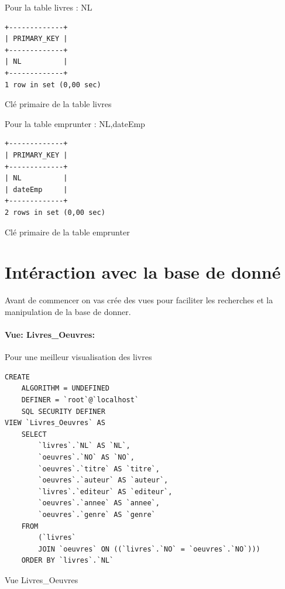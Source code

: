 \documentclass{article}
\begin{document}
\begin{center}
\begin{minipage}{0.5\linewidth}
Pour la table livres : NL
\begin{listing}[H]
\begin{verbatim}
+-------------+
| PRIMARY_KEY |
+-------------+
| NL          |
+-------------+
1 row in set (0,00 sec)
\end{verbatim}
	\caption{Clé primaire de la table livres}
\end{listing}
\end{minipage}

\vspace*{20pt}
\begin{minipage}{0.5\linewidth}
Pour la table emprunter : NL,dateEmp
\begin{listing}[H]
\begin{verbatim}
+-------------+
| PRIMARY_KEY |
+-------------+
| NL          |
| dateEmp     |
+-------------+
2 rows in set (0,00 sec)
\end{verbatim}
	\caption{Clé primaire de la table emprunter}
\end{listing}
\end{minipage}
\end{center}
\newpage

\section{Intéraction avec la base de donné}

Avant de commencer on vas crée des vues pour faciliter les recherches et la manipulation de la base de donner.


\paragraph{Vue: Livres\_Oeuvres: } Pour une meilleur visualisation des livres
\begin{listing}[H]
\begin{verbatim}
CREATE 
    ALGORITHM = UNDEFINED 
    DEFINER = `root`@`localhost` 
    SQL SECURITY DEFINER
VIEW `Livres_Oeuvres` AS
    SELECT 
        `livres`.`NL` AS `NL`,
        `oeuvres`.`NO` AS `NO`,
        `oeuvres`.`titre` AS `titre`,
        `oeuvres`.`auteur` AS `auteur`,
        `livres`.`editeur` AS `editeur`,
        `oeuvres`.`annee` AS `annee`,
        `oeuvres`.`genre` AS `genre`
    FROM
        (`livres`
        JOIN `oeuvres` ON ((`livres`.`NO` = `oeuvres`.`NO`)))
    ORDER BY `livres`.`NL`
\end{verbatim}
	\caption{Vue Livres\_Oeuvres}
\end{listing}
\end{document}
